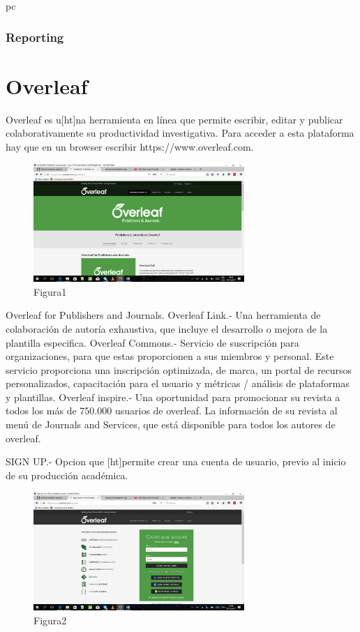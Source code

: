 pc\documentclass[a4paper,12pt,openany]{book}
\begin{document}
\begin{itemize}
\subsection{Reporting}



\chapter{Overleaf}

Overleaf es u[ht]na herramienta en línea que permite escribir, editar y publicar colaborativamente su productividad investigativa.  Para acceder a esta plataforma hay que en un browser escribir https://www.overleaf.com.
\begin{figure}[ht]
  \centering
	\includegraphics[width=8cm]{1.png}
\caption{Figura1}
  \label{fig:ejem[ht]plo1}
\end{figure}


Overleaf for Publishers and Journals.
Overleaf Link.- Una herramienta de colaboración de autoría exhaustiva, que incluye el desarrollo o mejora de la plantilla especifica.
Overleaf Commons.- Servicio de suscripción para organizaciones, para que estas proporcionen a sus miembros y personal. Este servicio proporciona una inscripción optimizada, de marca, un portal de recursos personalizados, capacitación para el usuario y métricas / análisis de plataformas y plantillas.
Overleaf inspire.- Una oportunidad para promocionar su revista a todos los más de 750.000 usuarios de overleaf. La información de su revista  al menú de Journals and Services, que está disponible para todos los autores de overleaf.

SIGN UP.- Opcion que [ht]permite crear una cuenta de usuario, previo al inicio de su producción académica.

\begin{figure}[ht]
  \centering
	\includegraphics[width=8cm]{2.png}
\caption{Figura2}
  \label{fig:ejemplo2}
\end{figure}


\end{itemize}
\end{document}
